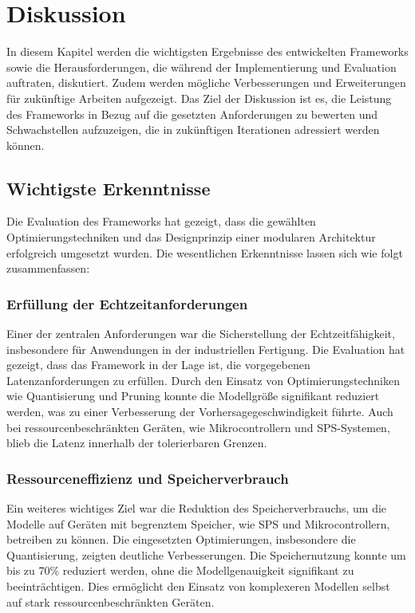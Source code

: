 \chapter{Diskussion}
\label{chap:diskussion}

In diesem Kapitel werden die wichtigsten Ergebnisse des entwickelten Frameworks sowie die Herausforderungen, die während der Implementierung und 
Evaluation auftraten, diskutiert. Zudem werden mögliche Verbesserungen und Erweiterungen für zukünftige Arbeiten aufgezeigt. 
Das Ziel der Diskussion ist es, die Leistung des Frameworks in Bezug auf die gesetzten Anforderungen zu bewerten und Schwachstellen aufzuzeigen, 
die in zukünftigen Iterationen adressiert werden können.

\section{Wichtigste Erkenntnisse}
Die Evaluation des Frameworks hat gezeigt, dass die gewählten Optimierungstechniken und das Designprinzip einer modularen Architektur erfolgreich 
umgesetzt wurden. Die wesentlichen Erkenntnisse lassen sich wie folgt zusammenfassen:

\subsection{Erfüllung der Echtzeitanforderungen}
Einer der zentralen Anforderungen war die Sicherstellung der Echtzeitfähigkeit, insbesondere für Anwendungen in der industriellen Fertigung. 
Die Evaluation hat gezeigt, dass das Framework in der Lage ist, die vorgegebenen Latenzanforderungen zu erfüllen. 
Durch den Einsatz von Optimierungstechniken wie Quantisierung und Pruning konnte die Modellgröße signifikant reduziert werden, 
was zu einer Verbesserung der Vorhersagegeschwindigkeit führte. Auch bei ressourcenbeschränkten Geräten, wie Mikrocontrollern und SPS-Systemen, 
blieb die Latenz innerhalb der tolerierbaren Grenzen.

\subsection{Ressourceneffizienz und Speicherverbrauch}
Ein weiteres wichtiges Ziel war die Reduktion des Speicherverbrauchs, um die Modelle auf Geräten mit begrenztem Speicher, 
wie SPS und Mikrocontrollern, betreiben zu können. Die eingesetzten Optimierungen, insbesondere die Quantisierung, zeigten deutliche Verbesserungen. 
Die Speichernutzung konnte um bis zu 70\% reduziert werden, ohne die Modellgenauigkeit signifikant zu beeinträchtigen. 
Dies ermöglicht den Einsatz von komplexeren Modellen selbst auf stark ressourcenbeschränkten Geräten.

